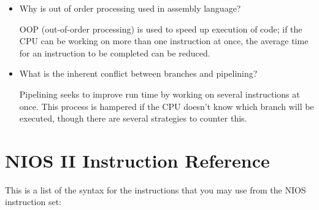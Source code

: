 \documentclass[10pt]{article}
\begin{document}
\begin{itemize}
\item Why is out of order processing used in assembly language?

OOP (out-of-order processing) is used to speed up execution of code; if the CPU can be working on more than one instruction at once, the average time for an instruction to be completed can be reduced.

\item What is the inherent conflict between branches and pipelining?

Pipelining seeks to improve run time by working on several instructions at once.  This process is hampered if the CPU doesn't know which branch will be executed, though there are several strategies to counter this.

\end{itemize}

\newpage

\section*{NIOS II Instruction Reference}

This is a list of the syntax for the instructions that you may use
from the NIOS instruction set:\\
\end{document}
